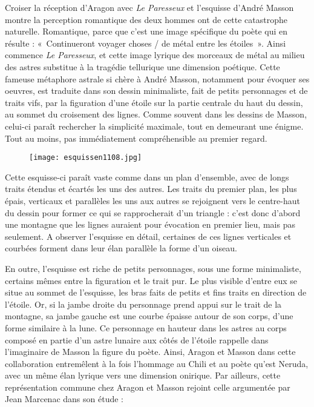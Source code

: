 Croiser la réception d’Aragon avec \emph{Le Paresseux} et l’esquisse d’André Masson montre la perception romantique des deux hommes ont de cette catastrophe naturelle. Romantique, parce que c’est une image spécifique du poète qui en résulte : « Continueront voyager choses / de métal entre les étoiles ». Ainsi commence \emph{Le Paresseux}, et cette image lyrique des morceaux de métal au milieu des astres substitue à la tragédie tellurique une dimension poétique. Cette fameuse métaphore astrale si chère à André Masson, notamment pour évoquer ses oeuvres, est traduite dans son dessin minimaliste, fait de petits personnages et de traits vifs, par la figuration d’une étoile sur la partie centrale du haut du dessin, au sommet du croisement des lignes. Comme souvent dans les dessins de Masson, celui-ci paraît rechercher la simplicité maximale, tout en demeurant une énigme. Tout au moins, pas immédiatement compréhensible au premier regard. 

\begin{figure}[H]
   \centering
   \texttt{[image: esquissen1108.jpg]}
	\caption{\cite{pabloneruda}}\label{fig:MassonNeruda}
\end{figure}

	Cette esquisse-ci paraît vaste comme dans un plan d’ensemble, avec de longs traits étendus et écartés les uns des autres. Les traits du premier plan, les plus épais, verticaux et parallèles les uns aux autres se rejoignent vers le centre-haut du dessin pour former ce qui se rapprocherait d’un triangle : c’est donc d’abord une montagne que les lignes auraient pour évocation en premier lieu, mais pas seulement. A observer l’esquisse en détail, certaines de ces lignes verticales et courbées forment dans leur élan parallèle la forme d’un oiseau. 

En outre, l’esquisse est riche de petits personnages, sous une forme minimaliste, certains mêmes entre la figuration et le trait pur. Le plus visible d’entre eux se situe au sommet de l’esquisse, les bras faits de petits et fins traits en direction de l’étoile. Or, si la jambe droite du personnage prend appui sur le trait de la montagne, sa jambe gauche est une courbe épaisse autour de son corps, d’une forme similaire à la lune. Ce personnage en hauteur dans les astres au corps composé en partie d’un astre lunaire aux côtés de l’étoile rappelle dans l’imaginaire de Masson la figure du poète. Ainsi, Aragon et Masson dans cette collaboration entremêlent à la fois l’hommage au Chili et au poète qu’est Neruda, avec un même élan lyrique vers une dimension onirique. Par ailleurs, cette représentation commune chez Aragon et Masson rejoint celle argumentée par Jean Marcenac dans son étude :

